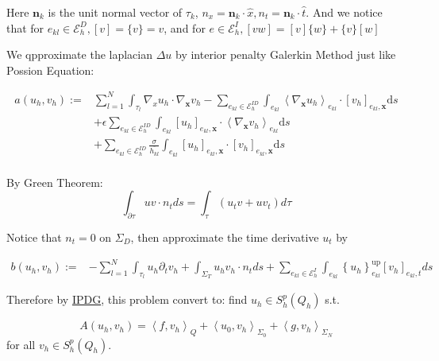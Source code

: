 Here $\textbf{n}_k$ is the unit normal vector of $\tau_k$, $n_x=\textbf{n}_k\cdot \hat{x}, n_t=\textbf{n}_k\cdot \hat{t}$. And we notice that for $e_{kl}\in \mathscr{E}_h^D,[v]=\{v\}=v$, and for $e\in \mathscr{E}_h^I,[vw]=[v]\{w\}+\{v\}[w]$

We qpproximate the laplacian $\Delta u$ by interior penalty Galerkin Method just like Possion Equation:

\begin{equation}\label{auv}
    \begin{aligned}
        a\left(u_{h}, v_{h}\right):=  &\sum_{l=1}^{N} \int_{\tau_{l}} \nabla_{x} u_{h} \cdot \nabla_{\boldsymbol{x}} v_{h} 
         -\sum_{e_{k l} \in \mathscr{E}_h^{ID}} \int_{e_{k l}}\left\langle\nabla_{\boldsymbol{x}} u_{h}\right\rangle_{e_{k l}} \cdot\left[v_{h}\right]_{e_{k l}, \boldsymbol{x}} \mathrm{d} s \\
        & +\epsilon\sum_{e_{k l} \in \mathscr{E}_h^{ID}} \int_{e_{k l}}\left[u_{h}\right]_{e_{k l}, \boldsymbol{x}} \cdot\left\langle\nabla_{\boldsymbol{x}} v_{h}\right\rangle_{e_{k l}} \mathrm{d} s \\
        & +\sum_{e_{k l} \in \mathscr{E}_h^{ID}} \frac{\sigma}{\overline{h_{k l}}} \int_{e_{k l}}\left[u_{h}\right]_{e_{k l}, \boldsymbol{x}} \cdot\left[v_{h}\right]_{e_{k l}, \boldsymbol{x}} \mathrm{d} s\\
    \end{aligned}
\end{equation}

By Green Theorem:
$$\int_{\partial \tau}uv \cdot n_t ds = \int_\tau (u_tv+uv_t)d\tau$$

Notice that $n_t=0$ on $\Sigma_D$, then approximate the time derivative $u_t$ by

\begin{equation}\label{buv}
    \begin{aligned}
        b\left(u_{h}, v_{h}\right):= &-\sum_{l=1}^{N} \int_{\tau_{l}} u_{h} \partial_{t} v_{h} +\int_{\Sigma_{T}} u_{h} v_{h} \cdot n_t ds  
         +\sum_{e_{k l} \in \mathscr{E}_h^{I}}\int_{e_{k l}}\left\{u_{h}\right\}_{e_{k l}}^{\mathrm{up}}\left[v_{h}\right]_{e_{k l}, t} ds
    \end{aligned}
\end{equation}

Therefore by \hyperref[Interior Penalty Discontinuous Galerkin Method]{IPDG}, this problem convert to: find $u_h\in S_h^p(Q_h)$ s.t.

$$A\left(u_{h}, v_{h}\right)=\left\langle f, v_{h}\right\rangle_{Q}+\left\langle u_{0}, v_{h}\right\rangle_{\Sigma_{0}}+\left\langle g, v_{h}\right\rangle_{\Sigma_{N}}$$
for all  $v_{h} \in S_{h}^{p}\left(Q_h\right) $.

